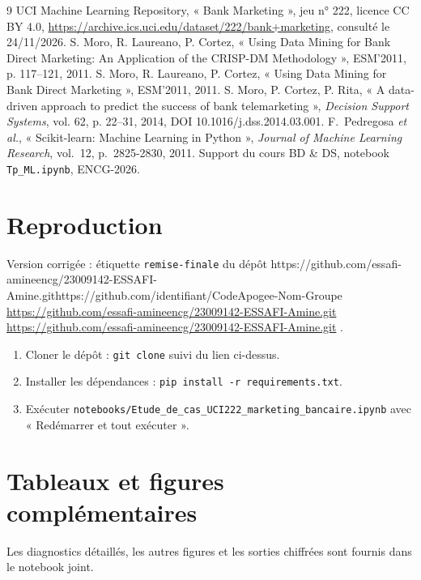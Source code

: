 \documentclass[11pt,a4paper]{article}
\newcounter{nbacompleter}
\newcommand{\lienDepot}{https://github.com/essafi-amineencg/23009142-ESSAFI-Amine.git}
\newcommand{\lienParDefaut}{https://github.com/identifiant/CodeApogee-Nom-Groupe}
\newcommand{\afficherlien}{%
  \ifx\lienDepot\lienParDefaut
    \stepcounter{nbacompleter}\textcolor{red}{\expandafter\url\expandafter{\lienDepot}}%
  \else
    \expandafter\url\expandafter{\lienDepot}%
  \fi}
\begin{document}
\begin{thebibliography}{9}
   UCI Machine Learning Repository, « Bank Marketing », jeu n° 222, licence CC BY 4.0, \url{https://archive.ics.uci.edu/dataset/222/bank+marketing}, consulté le 24/11/2026.
   S. Moro, R. Laureano, P. Cortez, « Using Data Mining for Bank Direct Marketing: An Application of the CRISP-DM Methodology », ESM'2011, p. 117--121, 2011.
   S. Moro, R. Laureano, P. Cortez, « Using Data Mining for Bank Direct Marketing », ESM'2011, 2011.
   S. Moro, P. Cortez, P. Rita, « A data-driven approach to predict the success of bank telemarketing », \textit{Decision Support Systems}, vol. 62, p. 22--31, 2014, DOI 10.1016/j.dss.2014.03.001.
   F.~Pedregosa \textit{et al.}, « Scikit-learn: Machine Learning in Python », \textit{Journal of Machine Learning Research}, vol.~12, p.~2825-2830, 2011.
   Support du cours BD \& DS, notebook \texttt{Tp\_ML.ipynb}, ENCG-2026.
\end{thebibliography}

\appendix

\section{Reproduction}
\label{ann:reproduction}
Version corrigée : étiquette \texttt{remise-finale} du dépôt \afficherlien.
\begin{enumerate}
  \item Cloner le dépôt : \texttt{git clone} suivi du lien ci-dessus.
  \item Installer les dépendances : \texttt{pip install -r requirements.txt}.
  \item Exécuter \texttt{notebooks/Etude\_de\_cas\_UCI222\_marketing\_bancaire.ipynb} avec « Redémarrer et tout exécuter ».
\end{enumerate}

\section{Tableaux et figures complémentaires}
\label{ann:complements}
Les diagnostics détaillés, les autres figures et les sorties chiffrées sont fournis dans le notebook joint.
\end{document}
